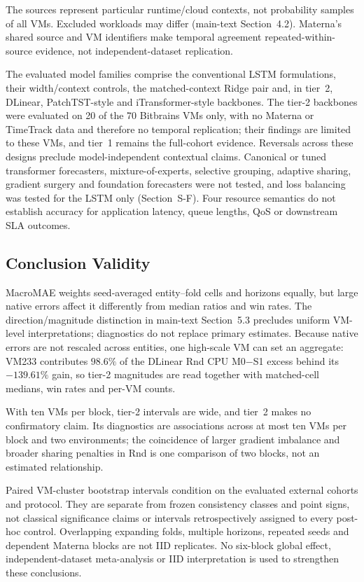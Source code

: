 \documentclass[a4paper,11pt]{article}
\begin{document}
The sources represent particular runtime/cloud contexts, not probability
samples of all VMs. Excluded workloads may differ
(main-text Section~4.2). Materna's shared source and VM
identifiers make temporal agreement repeated-within-source evidence, not
independent-dataset replication.

The evaluated model families comprise the conventional LSTM formulations,
their width/context controls, the matched-context Ridge pair and, in tier~2,
DLinear, PatchTST-style and iTransformer-style backbones. The tier-2
backbones were evaluated on 20 of the 70 Bitbrains VMs only, with no
Materna or TimeTrack data and therefore no temporal replication; their
findings are limited to these VMs, and tier~1 remains the full-cohort
evidence. Reversals across these designs preclude model-independent
contextual claims. Canonical or tuned transformer forecasters,
mixture-of-experts, selective grouping, adaptive sharing, gradient surgery
and foundation forecasters were not tested, and loss balancing was tested for
the LSTM only (Section~S-F). Four resource
semantics do not establish accuracy for application latency, queue lengths,
QoS or downstream SLA outcomes.

\subsection*{Conclusion Validity}


MacroMAE weights seed-averaged entity--fold cells and horizons equally, but
large native errors affect it differently from median ratios and win rates.
The direction/magnitude distinction in main-text Section~5.3 precludes
uniform VM-level interpretations; diagnostics do not replace primary estimates.
Because native errors are not rescaled across entities, one high-scale VM
can set an aggregate: VM233 contributes $98.6\%$ of the DLinear Rnd CPU
M0$-$S1 excess behind its $-139.61\%$ gain, so tier-2 magnitudes are read
together with matched-cell medians, win rates and per-VM counts.

With ten VMs per block, tier-2 intervals are wide, and tier~2 makes no
confirmatory claim. Its diagnostics are associations across at most ten VMs
per block and two environments; the coincidence of larger gradient
imbalance and broader sharing penalties in Rnd is one comparison of two
blocks, not an estimated relationship.

Paired VM-cluster bootstrap intervals condition on the evaluated external
cohorts and protocol. They are separate from frozen consistency classes and
point signs, not classical significance claims or intervals retrospectively
assigned to every post-hoc control. Overlapping expanding folds, multiple
horizons, repeated seeds and dependent Materna blocks are not IID replicates.
No six-block global effect, independent-dataset meta-analysis or IID
interpretation is used to strengthen these conclusions.
\end{document}
